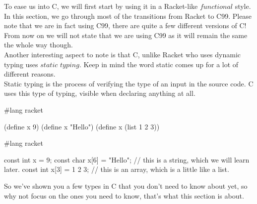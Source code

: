 
To ease us into C, we will first start by using it in a Racket-like $functional$ style.\\

In this section, we go through most of the transitions from Racket to C99.  Please note that we are in fact using C99, there are quite a few different versions of C!  From now on we will not state that we are using C99 as it will remain the same the whole way though.\\

Another interesting aspect to note is that C, unlike Racket who uses dynamic typing uses $static$ $typing$.  Keep in mind the word static comes up for a lot of different reasons.\\

 {
Static typing is the process of verifying the type of an input in the source code.  C uses this type of typing, visible when declaring anything at all.
	}



\begin{code}[Lisp]
#lang racket

(define x 9)
(define x "Hello")
(define x (list 1 2 3))

\end{code}


\begin{code}[C]
#lang racket

const int x = 9;
const char x[6] = "Hello"; // this is a string, which we will learn later.
const int x[3] = {1 2 3}; // this is an array, which is a little like a list.

\end{code}


So we've shown you a few types in C that you don't need to know about yet, so why not focus on the ones you need to know, that's what this section is about.\\

